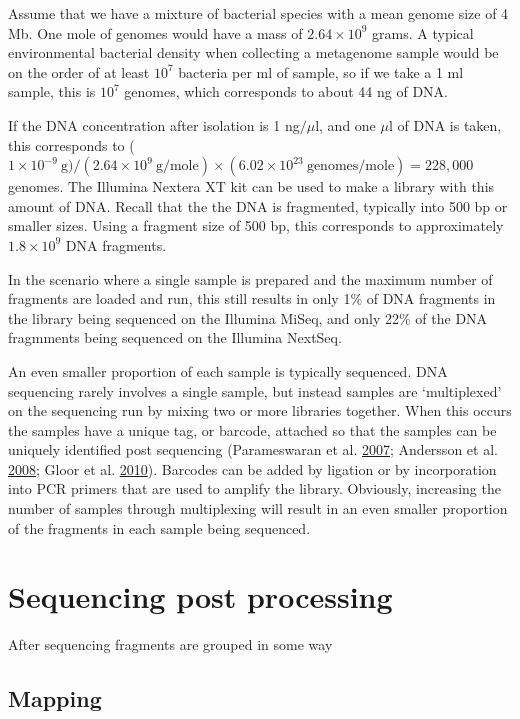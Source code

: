 \documentclass[onecolumn]{book}
\theoremstyle{definition}
\theoremstyle{definition}
\theoremstyle{definition}
\theoremstyle{remark}
\begin{document}
Assume that we have a mixture of bacterial species with a mean genome
size of 4 Mb. One mole of genomes would have a mass of
\(2.64 \times 10^9\) grams. A typical environmental bacterial density
when collecting a metagenome sample would be on the order of at least
\(10^7\) bacteria per ml of sample, so if we take a 1 ml sample, this is
\(10^7\) genomes, which corresponds to about 44 ng of DNA.

If the DNA concentration after isolation is 1 ng\(/ \mu\)l, and one
\(\mu\)l of DNA is taken, this corresponds to
(\(1\times 10^{-9} \mathrm{\ g}) / (2.64 \times 10^9\ \mathrm{g/mole}) \times (6.02 \times 10^{23} \mathrm{\ genomes/mole}) = 228,000\)
genomes. The Illumina Nextera XT kit can be used to make a library with
this amount of DNA. Recall that the the DNA is fragmented, typically
into 500 bp or smaller sizes. Using a fragment size of 500 bp, this
corresponds to approximately \(1.8 \times 10^9\) DNA fragments.

In the scenario where a single sample is prepared and the maximum number
of fragments are loaded and run, this still results in only 1\% of DNA
fragments in the library being sequenced on the Illumina MiSeq, and only
22\% of the DNA fragmments being sequenced on the Illumina NextSeq.

An even smaller proportion of each sample is typically sequenced. DNA
sequencing rarely involves a single sample, but instead samples are
`multiplexed' on the sequencing run by mixing two or more libraries
together. When this occurs the samples have a unique tag, or barcode,
attached so that the samples can be uniquely identified post sequencing
(Parameswaran et al. \protect\hyperlink{ref-Parameswaran:2007aa}{2007};
Andersson et al. \protect\hyperlink{ref-Andersson:2008}{2008}; Gloor et
al. \protect\hyperlink{ref-Gloor:2010}{2010}). Barcodes can be added by
ligation or by incorporation into PCR primers that are used to amplify
the library. Obviously, increasing the number of samples through
multiplexing will result in an even smaller proportion of the fragments
in each sample being sequenced.

\hypertarget{sequencing-post-processing}{%
\section{Sequencing post processing}\label{sequencing-post-processing}}

After sequencing fragments are grouped in some way

\hypertarget{mapping}{%
\subsection{Mapping}\label{mapping}}
\end{document}
